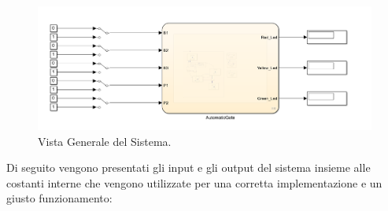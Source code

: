 \documentclass[12pt]{article}
\begin{document}
\begin{figure}[H]
    \centering
    \includegraphics[width=1\textwidth]{imm/Vista_Generale.png}
    \caption{Vista Generale del Sistema.}
\end{figure}

\newpage

\noindent Di seguito vengono presentati gli input e gli output del sistema insieme alle costanti interne che vengono utilizzate per una corretta implementazione e un giusto funzionamento:
\end{document}
